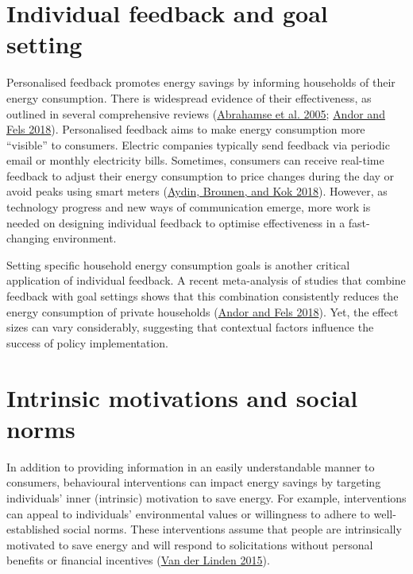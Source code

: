 \documentclass[
  11pt,
  captions=heading]{scrreport}
\begin{document}
\hypertarget{individual-feedback-and-goal-setting}{%
\section{Individual feedback and goal
setting}\label{individual-feedback-and-goal-setting}}

Personalised feedback promotes energy savings by informing households of
their energy consumption. There is widespread evidence of their
effectiveness, as outlined in several comprehensive reviews
(\protect\hyperlink{ref-abrahamse2005review}{Abrahamse et al. 2005};
\protect\hyperlink{ref-andor2018behavioral}{Andor and Fels 2018}).
Personalised feedback aims to make energy consumption more ``visible''
to consumers. Electric companies typically send feedback via periodic
email or monthly electricity bills. Sometimes, consumers can receive
real-time feedback to adjust their energy consumption to price changes
during the day or avoid peaks using smart meters
(\protect\hyperlink{ref-aydin2018information}{Aydin, Brounen, and Kok
2018}). However, as technology progress and new ways of communication
emerge, more work is needed on designing individual feedback to optimise
effectiveness in a fast-changing environment.

Setting specific household energy consumption goals is another critical
application of individual feedback. A recent meta-analysis of studies
that combine feedback with goal settings shows that this combination
consistently reduces the energy consumption of private households
(\protect\hyperlink{ref-andor2018behavioral}{Andor and Fels 2018}). Yet,
the effect sizes can vary considerably, suggesting that contextual
factors influence the success of policy implementation.

\hypertarget{intrinsic-motivations-and-social-norms}{%
\section{Intrinsic motivations and social
norms}\label{intrinsic-motivations-and-social-norms}}

In addition to providing information in an easily understandable manner
to consumers, behavioural interventions can impact energy savings by
targeting individuals' inner (intrinsic) motivation to save energy. For
example, interventions can appeal to individuals' environmental values
or willingness to adhere to well-established social norms. These
interventions assume that people are intrinsically motivated to save
energy and will respond to solicitations without personal benefits or
financial incentives (\protect\hyperlink{ref-van2015social}{Van der
Linden 2015}).
\end{document}
